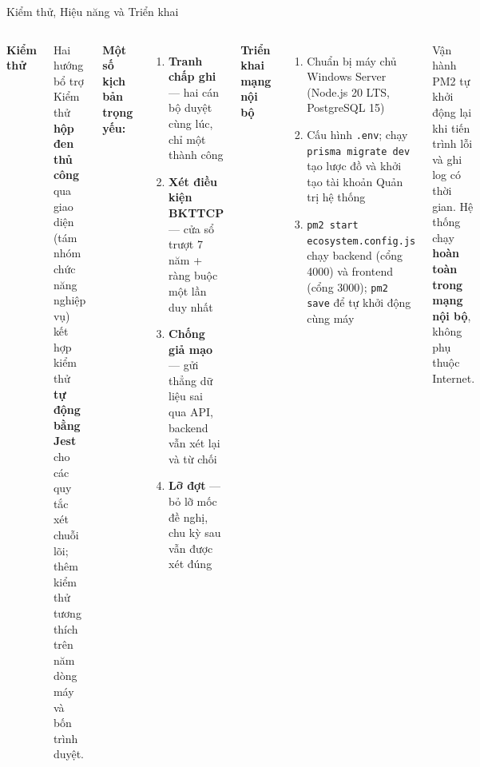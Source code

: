 \documentclass[aspectratio=43,xcolor=table]{beamer}
\begin{document}
\begin{frame}{Kiểm thử, Hiệu năng và Triển khai}
  \begin{columns}[T,onlytextwidth]
    \textbf{Kiểm thử}\\[0.2cm]

    \begin{block}{Hai hướng bổ trợ}
      \scriptsize Kiểm thử \textbf{hộp đen thủ công} qua giao diện (tám nhóm chức năng nghiệp vụ) kết hợp kiểm thử \textbf{tự động bằng Jest} cho các quy tắc xét chuỗi lõi; thêm kiểm thử tương thích trên năm dòng máy và bốn trình duyệt.
    \end{block}

    \scriptsize\textbf{Một số kịch bản trọng yếu:}
    \begin{enumerate}\scriptsize
      \item \textbf{Tranh chấp ghi} --- hai cán bộ duyệt cùng lúc, chỉ một thành công
      \item \textbf{Xét điều kiện BKTTCP} --- cửa sổ trượt 7 năm + ràng buộc một lần duy nhất
      \item \textbf{Chống giả mạo} --- gửi thẳng dữ liệu sai qua API, backend vẫn xét lại và từ chối
      \item \textbf{Lỡ đợt} --- bỏ lỡ mốc đề nghị, chu kỳ sau vẫn được xét đúng
    \end{enumerate}

    \textbf{Triển khai mạng nội bộ}\\[0.2cm]
    \scriptsize
    \begin{enumerate}
      \item Chuẩn bị máy chủ Windows Server (Node.js 20 LTS, PostgreSQL 15)
      \item Cấu hình \texttt{.env}; chạy \texttt{prisma migrate dev} tạo lược đồ và khởi tạo tài khoản Quản trị hệ thống
      \item \texttt{pm2 start ecosystem.config.js} chạy backend (cổng 4000) và frontend (cổng 3000); \texttt{pm2 save} để tự khởi động cùng máy
    \end{enumerate}

    \begin{block}{Vận hành}
      \scriptsize PM2 tự khởi động lại khi tiến trình lỗi và ghi log có thời gian. Hệ thống chạy \textbf{hoàn toàn trong mạng nội bộ}, không phụ thuộc Internet.
    \end{block}
  \end{columns}
\end{frame}
\end{document}
